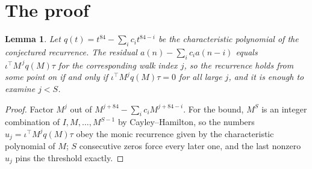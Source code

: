 \documentclass[11pt,a4paper]{article}
\theoremstyle{plain}
\newtheorem{lemma}[theorem]{Lemma}
\theoremstyle{definition}
\begin{document}
\section{The proof}

\begin{lemma}\label{lem:crit}
Let $q(t)=t^{84}-\sum_i c_it^{84-i}$ be the characteristic polynomial of the
conjectured recurrence. The residual $a(n)-\sum_ic_ia(n-i)$ equals
$\iota^{\!\top}M^{\,j}q(M)\tau$ for the corresponding walk index $j$, so the recurrence
holds from some point on if and only if $\iota^{\!\top}M^{j}q(M)\tau=0$ for all large $j$,
and it is enough to examine $j<S$.
\end{lemma}

\begin{proof}
Factor $M^{j}$ out of $M^{j+84}-\sum_ic_iM^{j+84-i}$. For the bound, $M^{S}$
is an integer combination of $I,M,\dots,M^{S-1}$ by Cayley--Hamilton, so the numbers
$u_j=\iota^{\!\top}M^{j}q(M)\tau$ obey the monic recurrence given by the characteristic
polynomial of $M$; $S$ consecutive zeros force every later one, and the last nonzero $u_j$
pins the threshold exactly.
\end{proof}
\end{document}
